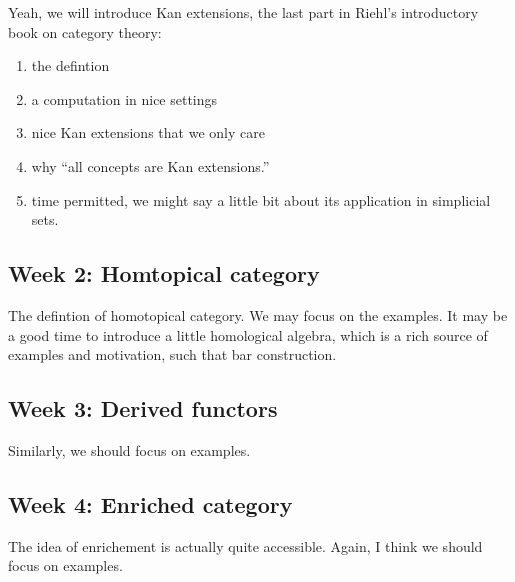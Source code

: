 \documentclass[11pt]{article}
\begin{document}
Yeah, we will introduce Kan extensions, the last part in Riehl's introductory book on category theory:
\begin{enumerate}
    \item the defintion
    \item a computation in nice settings
    \item nice Kan extensions that we only care
    \item why ``all concepts are Kan extensions.''
    \item time permitted, we might say a little bit about its application in simplicial sets.
\end{enumerate}

\subsection{Week 2: Homtopical category}

The defintion of homotopical category. We may focus on the examples.
It may be a good time to introduce a little homological algebra,
which is a rich source of examples and motivation,
such that bar construction.

\subsection{Week 3: Derived functors}

Similarly, we should focus on examples.

\subsection{Week 4: Enriched category}

The idea of enrichement is actually quite accessible.
Again, I think we should focus on examples.
\end{document}
